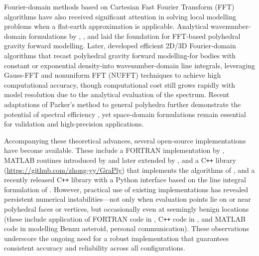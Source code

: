 \documentclass{seg}
\begin{document}
Fourier-domain methods based on Cartesian Fast Fourier Transform (FFT) algorithms have also received significant attention in solving local modelling problems when a flat-earth approximation is applicable. Analytical wavenumber-domain formulations by \citet{Pedersen1978Geophysics}, \citet{1983WuXZ_CJG}, and \citet{Hansen1988Geophysics} laid the foundation for FFT-based polyhedral gravity forward modelling. Later, \citet{Wu2019JGeod,Wu2019JGeoda} developed efficient 2D/3D Fourier-domain algorithms that recast polyhedral gravity forward modelling-for bodies with constant or exponential density-into wavenumber-domain line integrals, leveraging Gauss-FFT \citep{Wu2014Geophysics} and nonuniform FFT (NUFFT) \citep{Greengard2004SIAMRev.,Keiner2009ACMTrans.Math.Softw.} techniques to achieve high computational accuracy, though computational cost still grows rapidly with model resolution due to the analytical evaluation of the spectrum. Recent adaptations of Parker's method to general polyhedra further demonstrate the potential of spectral efficiency \cite{Wu2021J.Geophys.Res.SolidEarth}, yet space-domain formulations remain essential for validation and high-precision applications.

Accompanying these theoretical advances, several open-source implementations have become available. These include a FORTRAN implementation by \citet{Tsoulis2012Geophysics}, MATLAB routines introduced by \citet{Singh2001Geophysics} and later extended by \citet{Saraswati2019JGeod}, and a C\texttt{++} library (\url{https://github.com/zhong-yy/GraPly}) that implements the algorithms of \citet{Ren2017SurvGeophys,Ren2018GEOPHYSICS,Ren2020SurvGeophys,Ren2022GeophysicalResearchLetters}, and a recently released C\texttt{++} library with a Python interface based on the line integral formulation of \citet{Tsoulis2012Geophysics} \citep{Schuhmacher2024JOSS}. However, practical use of existing implementations has revealed persistent numerical instabilities—not only when evaluation points lie on or near polyhedral faces or vertices, but occasionally even at seemingly benign locations (these include application of \citet{Tsoulis2012Geophysics} FORTRAN code in \citet{Wu2016Geophys.J.Int.}, \citet{Ren2018GEOPHYSICS} C\texttt{++} code in \citet{Zhou2020Geophysics}, and \citet{Saraswati2019JGeod} MATLAB code in modelling Bennu asteroid, personal communication). These observations underscore the ongoing need for a robust implementation that guarantees consistent accuracy and reliability across all configurations.
\end{document}
